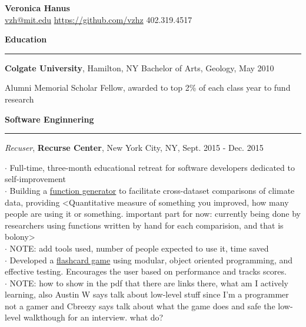 \documentclass[11pt]{article}
\begin{document}
\bigskip
\begin{flushleft}
\LARGE{\textbf{Veronica Hanus}}\\
\large{\href{mailto:vzh@mit.edu}{vzh@mit.edu}} \hspace*{0.002in} \normalsize{\url{https://github.com/vzhz}} \hspace*{0.002in} \normalsize{402.319.4517}\\
\end{flushleft}
\smallskip

\vspace*{0.25 mm}
\textbf{Education}
\smallskip
\hrule 
\textbf{Colgate University}, Hamilton, NY\hspace*{2.2 in} 	Bachelor of Arts, Geology, May 2010\\	
\begin{small}Alumni Memorial Scholar Fellow, awarded to top 2\% of each class year to fund research\end{small}

\vspace*{0.25 mm}
\textbf{Software Enginnering}
\smallskip
\hrule
\emph{Recuser}, \textbf {Recurse Center}, New York City, NY, Sept. 2015 - Dec. 2015 \\ 
\begin{small}$\cdot$ {Full-time, three-month educational retreat for software developers dedicated to self-improvement}\\ 
$\cdot$ {Building a \href{https://github.com/vzhz/function_generator/blob/master/README.md}{function generator} to facilitate cross-dataset comparisons of climate data, providing <Quantitative measure of something you improved, how many people are using it or something. important part for now: currently being done by researchers using functions written by hand for each comparision, and that is bolony>}\\
$\cdot$ {NOTE: add tools used, number of people expected to use it, time saved}\\
$\cdot$ {Developed a \href{https://github.com/vzhz/geography_guessing_game/blob/master/README.md}{flashcard game} using modular, object oriented programming, and effective testing. Encourages the user based on performance and tracks scores.}\\
$\cdot$ {NOTE: how to show in the pdf that there are links there, what am I actively learning, also Austin W says talk about low-level stuff since I'm a programmer not a gamer and Cbreezy says talk about what the game does and safe the low-level walkthough for an interview. what do?}\end{small}
\end{document}

